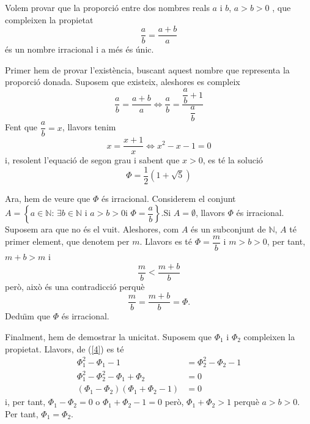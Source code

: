 \begin{exem}
Volem provar que la proporci\'{o} entre dos nombres reals $a$ i $b$, $a>b>0$%
, que compleixen la propietat%
\begin{equation*}
\frac{a}{b}=\frac{a+b}{a}
\end{equation*}
\'{e}s un nombre irracional i a m\'{e}s \'{e}s \'{u}nic.
\end{exem}

\begin{solucio}
Primer hem de provar l'exist\`{e}ncia, buscant aquest nombre que representa
la proporci\'{o} donada. Suposem que existeix, aleshores es compleix%
\begin{equation*}
\frac{a}{b}=\frac{a+b}{a}\Longleftrightarrow\frac{a}{b}=\frac{\dfrac{a}{b}+1%
}{\dfrac{a}{b}}
\end{equation*}
Fent que $\dfrac{a}{b}=x$, llavors tenim%
\begin{equation*}
x=\frac{x+1}{x}\Longleftrightarrow x^{2}-x-1=0
\end{equation*}
i, resolent l'equaci\'{o} de segon grau i sabent que $x>0$, es t\'{e} la
soluci\'{o}%
\begin{equation*}
\Phi=\frac{1}{2}\left( 1+\sqrt{5}\right)
\end{equation*}

Ara, hem de veure que $\Phi$ \'{e}s irracional. Considerem el conjunt $%
A=\left\{ a\in\mathbb{N}\text{: }\exists b\in\mathbb{N}\text{ i }a>b>0\text{
i }\Phi=\dfrac{a}{b}\right\} $.Si $A=\emptyset$, llavors $\Phi$ \'{e}s
irracional. Suposem ara que no \'{e}s el vuit. Aleshores, com $A$ \'{e}s un
subconjunt de $\mathbb{N}$, $A$ t\'{e} primer element, que denotem per $m$.
Llavors es t\'{e} $\Phi=\dfrac{m}{b}$ i $m>b>0$, per tant, $m+b>m$ i%
\begin{equation*}
\dfrac{m}{b}<\frac{m+b}{b}
\end{equation*}
per\`{o}, aix\`{o} \'{e}s una contradicci\'{o} perqu\`{e}%
\begin{equation*}
\frac{m}{b}=\frac{m+b}{b}=\Phi\text{.}
\end{equation*}
Dedu\"{\i}m que $\Phi$ \'{e}s irracional.

Finalment, hem de demostrar la unicitat. Suposem que $\Phi_{1}$ i $\Phi_{2} $
compleixen la propietat. Llavors, de (\ref{4}) es t\'{e}%
\begin{align*}
\Phi_{1}^{2}-\Phi_{1}-1 & =\Phi_{2}^{2}-\Phi_{2}-1 \\
\Phi_{1}^{2}-\Phi_{2}^{2}-\Phi_{1}+\Phi_{2} & =0 \\
\left( \Phi_{1}-\Phi_{2}\right) \left( \Phi_{1}+\Phi_{2}-1\right) & =0
\end{align*}
i, per tant, $\Phi_{1}-\Phi_{2}=0$ o $\Phi_{1}+\Phi_{2}-1=0$ per\`{o}, $%
\Phi_{1}+\Phi_{2}>1$ perqu\`{e} $a>b>0$. Per tant, $\Phi_{1}=\Phi_{2}$.
\end{solucio}


